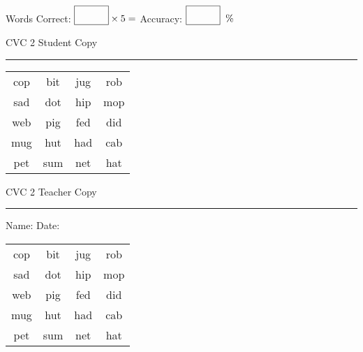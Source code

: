 \documentclass{memoir}
\begin{document}
\small

Words Correct: $\fbox{\phantom{\huge 100}} \times 5 = $ Accuracy: $\fbox{\phantom{\huge 100}}\;\; \%$ 

\vfill

\newpage


\footnotesize \noindent
CVC 2 \hfill Student Copy
\smallskip
\hrule

\Large

\setlength{\tabcolsep}{14pt}
\def\arraystretch{2}

{\selectfont


\begin{vplace}[0.5]
\begin{center}
\begin{tabular}{cccc}
cop & bit & jug & rob \\
sad & dot & hip & mop \\
web & pig & fed & did \\
mug & hut & had & cab \\
pet & sum & net & hat \\
\end{tabular}
\end{center}
\end{vplace}

}

\newpage

\footnotesize \noindent
CVC 2 \hfill Teacher Copy
\smallskip
\hrule

\small

\vfill

\noindent
Name: \underline{\hspace{1.75in}} \hfill Date: \underline{\hspace{1in}}

\Large

{\selectfont


\begin{vplace}[0.5]
\begin{center}
\begin{tabular}{cccc}
cop & bit & jug & rob \\
sad & dot & hip & mop \\
web & pig & fed & did \\
mug & hut & had & cab \\
pet & sum & net & hat \\
\end{tabular}
\end{center}
\end{vplace}



}
\end{document}
